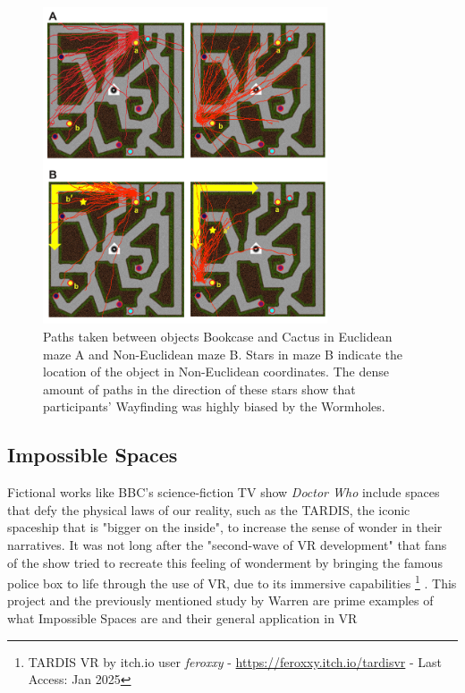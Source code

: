 \begin{figure}[p]
    \centering
    \includegraphics[width=0.75\textwidth]{NOVAthesisFiles/Images/papers/warrens-mazes-paths.png}
    \caption{Paths taken between objects Bookcase and Cactus in Euclidean maze A and Non-Euclidean maze B. 
    Stars in maze B indicate the location of the object in Non-Euclidean coordinates. The dense amount of paths in the direction of these 
    stars show that participants' Wayfinding was highly biased by the Wormholes. \cite{Warren2019}}
    \label{fig:warrens-mazes-paths}
\end{figure}


\subsection{Impossible Spaces}
\label{sec:impossible-spaces}

Fictional works like BBC's science-fiction TV show \textit{Doctor Who} include spaces that defy the physical laws of our reality, 
such as the TARDIS, the iconic spaceship that is "bigger on the inside", to increase the sense of wonder in their narratives. 
It was not long after the "second-wave of \gls{VR} development" \cite{Anthes2016} that fans of the show tried to recreate this feeling of 
wonderment by bringing the famous police box to life through the use of \gls{VR}, due to its immersive capabilities
\footnote{TARDIS VR by itch.io user \textit{feroxxy} - \href{https://feroxxy.itch.io/tardisvr}{https://feroxxy.itch.io/tardisvr} - Last Access: Jan 2025 } 
. This project and the previously mentioned study by Warren \cite{Warren2019} are prime examples of what Impossible Spaces are and their 
general application in \gls{VR}

